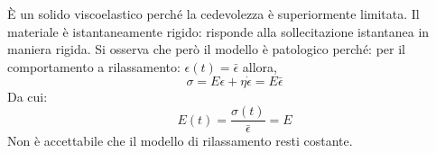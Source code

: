 È un solido viscoelastico perché la cedevolezza è superiormente limitata.
Il materiale è istantaneamente rigido: risponde alla sollecitazione istantanea in maniera rigida.
Si osserva che però il modello è patologico perché:
per il comportamento a rilassamento: $\epsilon(t) = \bar{\epsilon}$ allora,
\begin{equation}
\sigma = E\epsilon + \eta \dot{\epsilon} = E \bar{\epsilon}
\end{equation}
Da cui:
\begin{equation}
E(t) = \frac{\sigma(t)}{\bar{\epsilon}} = E
\end{equation}
Non è accettabile che il modello di rilassamento resti costante.